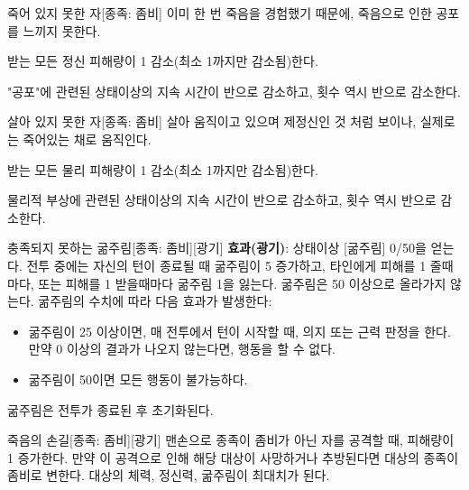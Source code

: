 \documentclass{report}
\begin{document}
	\begin{story}{죽어 있지 못한 자}{[종족: 좀비]}
		이미 한 번 죽음을 경험했기 때문에, 죽음으로 인한 공포를 느끼지 못한다.
		
		받는 모든 정신 피해량이 1 감소(최소 1까지만 감소됨)한다.
		
		"공포"에 관련된 상태이상의 지속 시간이 반으로 감소하고, 횟수 역시 반으로 감소한다.
		
		\smallskip
		
	\end{story}
	
	\begin{story}{살아 있지 못한 자}{[종족: 좀비]}
		살아 움직이고 있으며 제정신인 것 처럼 보이나, 실제로는 죽어있는 채로 움직인다.
		
		받는 모든 물리 피해량이 1 감소(최소 1까지만 감소됨)한다.
		
		물리적 부상에 관련된 상태이상의 지속 시간이 반으로 감소하고, 횟수 역시 반으로 감소한다.
		
		\smallskip
		
	\end{story}
	
	\begin{story}{충족되지 못하는 굶주림}{[종족: 좀비][광기]}
		\textbf{효과(광기)}: 상태이상 [굶주림] 0/50을 얻는다. 전투 중에는 자신의 턴이 종료될 때 굶주림이 5 증가하고, 타인에게 피해를 1 줄때마다, 또는 피해를 1 받을때마다 굶주림 1을 잃는다. 굶주림은 50 이상으로 올라가지 않는다. 굶주림의 수치에 따라 다음 효과가 발생한다:
		\begin{itemize}
			\item 굶주림이 25 이상이면, 매 전투에서 턴이 시작할 때, 의지 또는 근력 판정을 한다. 만약 0 이상의 결과가 나오지 않는다면, 행동을 할 수 없다.
			\item 굶주림이 50이면 모든 행동이 불가능하다.
		\end{itemize}
		굶주림은 전투가 종료된 후 초기화된다.
		
		\smallskip
		
	\end{story}
	
	\begin{story}{죽음의 손길}{[종족: 좀비][광기]}
		맨손으로 종족이 좀비가 아닌 자를 공격할 때, 피해량이 1 증가한다. 만약 이 공격으로 인해 해당 대상이 사망하거나 추방된다면 대상의 종족이 좀비로 변한다. 대상의 체력, 정신력, 굶주림이 최대치가 된다.
		
		\smallskip
		
	\end{story}
\end{document}
